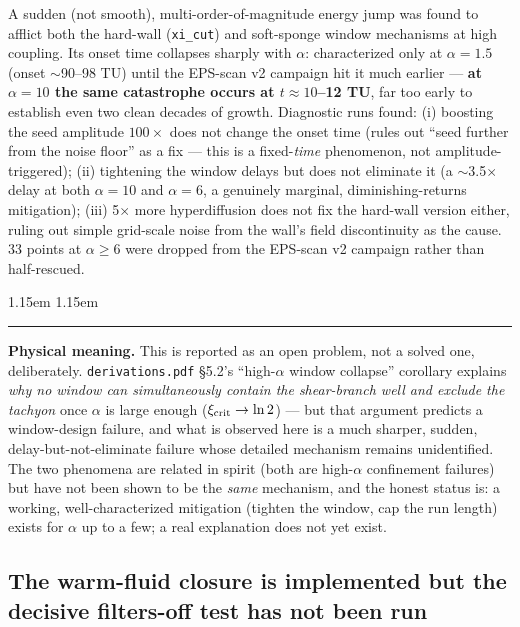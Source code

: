 \documentclass[11pt,a4paper]{article}
\numberwithin{equation}{section}
\theoremstyle{remark}
\newenvironment{physmeaning}%
{\par\medskip\noindent
 \begin{list}{}{\leftmargin 1.15em \rightmargin 1.15em \listparindent 0pt
 \itemindent 0pt \parsep 2pt \topsep 2pt}\item\relax
 \small\textcolor{meancol}{\rule[-0.6ex]{2.6pt}{2.4ex}}\hspace{0.55em}%
 \textcolor{meancol}{\textbf{Physical meaning.}}\hspace{0.5em}\ignorespaces}%
{\end{list}\medskip}
\begin{document}
A sudden (not smooth), multi-order-of-magnitude energy jump was found to
afflict both the hard-wall (\texttt{xi\_cut}) and soft-sponge window
mechanisms at high coupling. Its onset time collapses sharply with
$\alpha$: characterized only at $\alpha=1.5$ (onset $\sim$90--98 TU)
until the EPS-scan v2 campaign hit it much earlier ---
\textbf{at $\alpha=10$ the same catastrophe occurs at $t\approx10$--12 TU},
far too early to establish even two clean decades of growth. Diagnostic
runs found: (i) boosting the seed amplitude $100\times$ does not change
the onset time (rules out ``seed further from the noise floor'' as a
fix --- this is a fixed-\emph{time} phenomenon, not amplitude-triggered);
(ii) tightening the window delays but does not eliminate it (a
$\sim$3.5$\times$ delay at both $\alpha=10$ and $\alpha=6$, a genuinely
marginal, diminishing-returns mitigation); (iii) 5$\times$ more
hyperdiffusion does not fix the hard-wall version either, ruling out
simple grid-scale noise from the wall's field discontinuity as the cause.
33 points at $\alpha\ge6$ were dropped from the EPS-scan v2 campaign
rather than half-rescued.

\begin{physmeaning}
This is reported as an open problem, not a solved one, deliberately.
\texttt{derivations.pdf} \S5.2's ``high-$\alpha$ window collapse''
corollary explains \emph{why no window can simultaneously contain the
shear-branch well and exclude the tachyon} once $\alpha$ is large enough
($\xi_{\rm crit}\to\ln2$) --- but that argument predicts a
window-design failure, and what is observed here is a much sharper,
sudden, delay-but-not-eliminate failure whose detailed mechanism remains
unidentified. The two phenomena are related in spirit (both are
high-$\alpha$ confinement failures) but have not been shown to be the
\emph{same} mechanism, and the honest status is: a working, well-characterized
mitigation (tighten the window, cap the run length) exists for
$\alpha$ up to a few; a real explanation does not yet exist.
\end{physmeaning}

\subsection{The warm-fluid closure is implemented but the decisive
filters-off test has not been run}
\end{document}
